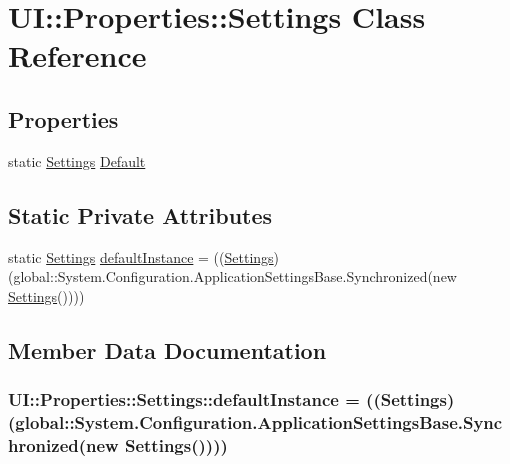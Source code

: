 \hypertarget{class_u_i_1_1_properties_1_1_settings}{
\section{UI::Properties::Settings Class Reference}
\label{class_u_i_1_1_properties_1_1_settings}
}
\subsection*{Properties}
\begin{DoxyCompactItemize}
\item 
static \hyperlink{class_u_i_1_1_properties_1_1_settings}{Settings} \hyperlink{class_u_i_1_1_properties_1_1_settings_a15a0e6993e5dd68352a2c6f989ad5943}{Default}
\end{DoxyCompactItemize}
\subsection*{Static Private Attributes}
\begin{DoxyCompactItemize}
\item 
static \hyperlink{class_u_i_1_1_properties_1_1_settings}{Settings} \hyperlink{class_u_i_1_1_properties_1_1_settings_a654aafd84668bf6efdca665b4534ec55}{defaultInstance} = ((\hyperlink{class_u_i_1_1_properties_1_1_settings}{Settings})(global::System.Configuration.ApplicationSettingsBase.Synchronized(new \hyperlink{class_u_i_1_1_properties_1_1_settings}{Settings}())))
\end{DoxyCompactItemize}


\subsection{Member Data Documentation}
\hypertarget{class_u_i_1_1_properties_1_1_settings_a654aafd84668bf6efdca665b4534ec55}{
\subsubsection[{defaultInstance}]{ {\bf UI::Properties::Settings::defaultInstance} = (({\bf Settings})(global::System.Configuration.ApplicationSettingsBase.Synchronized(new {\bf Settings}())))}}
\label{class_u_i_1_1_properties_1_1_settings_a654aafd84668bf6efdca665b4534ec55}


